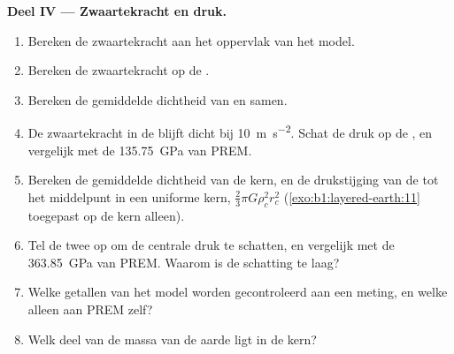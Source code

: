 \begin{problem}
\noindent\textbf{Deel IV --- Zwaartekracht en druk.}
\begin{enumerate}[resume]
  \item Bereken de zwaartekracht aan het oppervlak van het model.
  \item Bereken de zwaartekracht op de .
  \item Bereken de gemiddelde dichtheid van  en  samen.
  \item De zwaartekracht in de  blijft dicht bij \qty{10}{m.s^{-2}}. Schat de druk op de , en vergelijk met de
        \qty{135.75}{GPa} van PREM.
  \item Bereken de gemiddelde dichtheid van de kern, en de drukstijging van de  tot het middelpunt in een uniforme kern,
        $\tfrac23\pi G\rho_c^2 r_c^2$ (\cref{exo:b1:layered-earth:11} toegepast op de kern alleen).
  \item Tel de twee op om de centrale druk te schatten, en vergelijk met de \qty{363.85}{GPa} van PREM. Waarom is de schatting te laag?
  \item Welke getallen van het model worden gecontroleerd aan een meting, en welke alleen aan PREM zelf?
  \item Welk deel van de massa van de aarde ligt in de kern?
\end{enumerate}
\end{problem}
